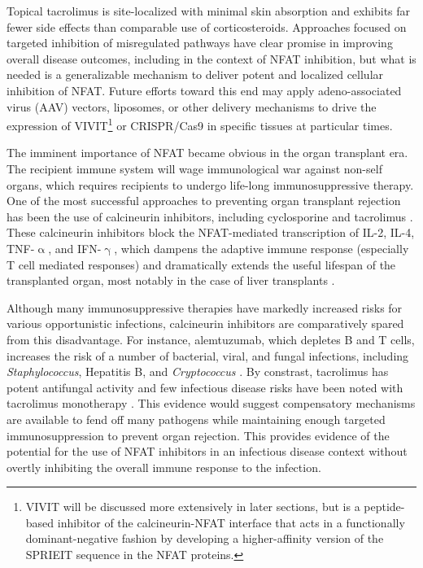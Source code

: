 Topical tacrolimus is site\hyp{}localized with minimal skin absorption and exhibits far fewer side effects than comparable use of corticosteroids. Approaches focused on targeted inhibition of misregulated pathways have clear promise in improving overall disease outcomes, including in the context of NFAT inhibition, but what is needed is a generalizable mechanism to deliver potent and localized cellular inhibition of NFAT. Future efforts toward this end may apply adeno\hyp{}associated virus (AAV) vectors, liposomes, or other delivery mechanisms to drive the expression of VIVIT\footnote{VIVIT will be discussed more extensively in later sections, but is a peptide\hyp{}based inhibitor of the calcineurin\hyp{}NFAT interface that acts in a functionally dominant\hyp{}negative fashion by developing a higher\hyp{}affinity version of the SPRIEIT sequence in the NFAT proteins.} or CRISPR/Cas9 in specific tissues at particular times.

The imminent importance of NFAT became obvious in the organ transplant era. The recipient immune system will wage immunological war against non\hyp{}self organs, which requires recipients to undergo life\hyp{}long immunosuppressive therapy. One of the most successful approaches to preventing organ transplant rejection has been the use of calcineurin inhibitors, including cyclosporine and tacrolimus \citep{Ellis1995, Scott2003, Mihatsch1998, Lerut2008}. These calcineurin inhibitors block the NFAT\hyp{}mediated transcription of IL\hyp{}2, IL\hyp{}4, TNF\hyp{}$\upalpha$, and IFN\hyp{}$\upgamma$, which dampens the adaptive immune response (especially T cell mediated responses) and dramatically extends the useful lifespan of the transplanted organ, most notably in the case of liver transplants \citep{McCaffrey1993, Moench2007}. 

Although many immunosuppressive therapies have markedly increased risks for various opportunistic infections, calcineurin inhibitors are comparatively spared from this disadvantage. For instance, alemtuzumab, which depletes B and T cells, increases the risk of a number of bacterial, viral, and fungal infections, including \textit{Staphylococcus}, Hepatitis B, and \textit{Cryptococcus} \citep{Harris2021, Fishman2007}. By constrast, tacrolimus has potent antifungal activity and few infectious disease risks have been noted with tacrolimus monotherapy \citep{Singh2016b, Gong2021, Papon2021, McAlister2006, Emal2019}. This evidence would suggest compensatory mechanisms are available to fend off many pathogens while maintaining enough targeted immunosuppression to prevent organ rejection. This provides evidence of the potential for the use of NFAT inhibitors in an infectious disease context without overtly inhibiting the overall immune response to the infection. 

